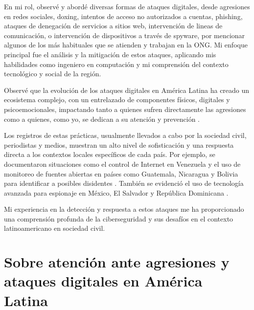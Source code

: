 \documentclass[12pt]{caltech_thesis}
\begin{document}
En mi rol, observé y abordé diversas formas de ataques digitales, desde agresiones en redes sociales, doxing, intentos de acceso no autorizados a cuentas, phishing, ataques de denegación de servicios  a sitios web, intervención de lineas de comunicación, o intervención de dispositivos a través de spyware, por mencionar algunos de los más habituales que se atienden y trabajan en la ONG. Mi enfoque principal fue el análisis y la mitigación de estos ataques, aplicando mis habilidades como ingeniero en computación y mi comprensión del contexto tecnológico y social de la región.

Observé que la evolución de los ataques digitales en América Latina ha creado un ecosistema complejo, con un entrelazado de componentes físicos, digitales y psicoemocionales, impactando tanto a quienes sufren directamente las agresiones como a quienes, como yo, se dedican a su atención y prevención \citep{ElPais-CeilioPineda-2021, FernandaGarrido-ViolenciaDigital-2020, NYT-JavierValdez-2018, UNESCO-SDPeriodismo-2016}.

Los registros de estas prácticas, usualmente llevados a cabo por la sociedad civil, periodistas y medios, muestran un alto nivel de sofisticación y una respuesta directa a los contextos locales específicos de cada país. Por ejemplo, se documentaron situaciones como el control de Internet en Venezuela \citep{VeSinFiltro-Reporte-2023} y el uso de monitoreo de fuentes abiertas en países como Guatemala, Nicaragua y Bolivia para identificar a posibles disidentes \citep{CICIG-GuateNetCenters-2019, Articulo19-Guatemala-2021}. También se evidenció el uso de tecnología avanzada para espionaje en México, El Salvador y República Dominicana \citep{CitizenLab-Mexico-Reckless, CitizenLab-ElSalvador-2022, AmnestyInternational-RepublicaDominicana-2023}.

Mi experiencia en la detección y respuesta a estos ataques me ha proporcionado una comprensión profunda de la ciberseguridad y sus desafíos en el contexto latinoamericano en sociedad civil.

\section{Sobre atención ante agresiones y ataques digitales en América Latina}
\end{document}
